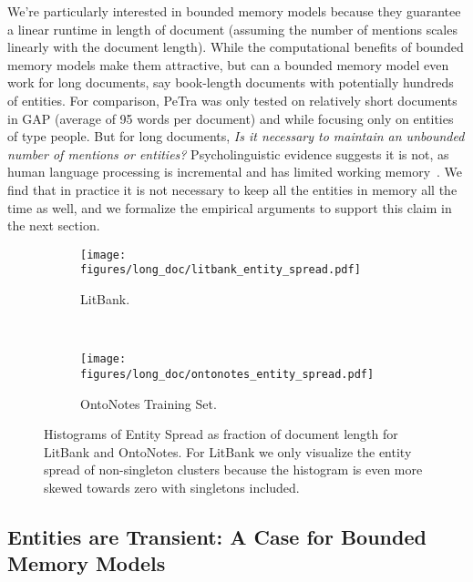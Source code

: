 \documentclass[12pt]{thesis-umich}[thesis]
\begin{document}
We're particularly interested in bounded memory models because they guarantee a linear runtime in length of document (assuming the number of mentions scales linearly with the document length). 
While the computational benefits of bounded memory models make them attractive, but can a bounded memory model even work for long documents, say book-length documents with potentially hundreds of entities. For comparison, PeTra was only tested on relatively short documents in GAP (average of 95 words per document) and while focusing only on entities of type people.
But for long documents, \emph{Is it necessary to maintain an unbounded number of mentions or entities?}  
Psycholinguistic evidence suggests it is not, as human language processing is incremental \citep{Tanenhaus1632, keller2010cognitively} and has limited working memory~\citep{baddeley1986}. 
We find that in practice it is not necessary to keep all the entities in memory all the time as well, and we formalize the empirical arguments to support this claim in the next section.

\begin{figure*}[t]
\centering
\begin{subfigure}[b]{0.45\textwidth}
        \centering
        \texttt{[image: figures/long\_doc/litbank\_entity\_spread.pdf]}
        \caption{LitBank.}
        \label{fig:litbank_spread}
    \end{subfigure}~
    \begin{subfigure}[b]{0.45\textwidth}
        \centering
        \texttt{[image: figures/long\_doc/ontonotes\_entity\_spread.pdf]}
        \caption{OntoNotes Training Set.}
        \label{fig:ontonotes_spread}
    \end{subfigure}
    \caption{Histograms of Entity Spread as fraction of document length for LitBank and OntoNotes. For LitBank we only visualize the entity spread of non-singleton clusters because the histogram is even more skewed towards zero with singletons included. }
    \label{fig:entity_spread}
\end{figure*}

 
\subsection{Entities are Transient: A Case for Bounded Memory Models}
\begin{table}[h]
    \caption{Max.\ Total Entity Count vs.\ Max.\ Active Entity Count.}
    \label{sec:tab_active_entities}

\end{table}
\end{document}
